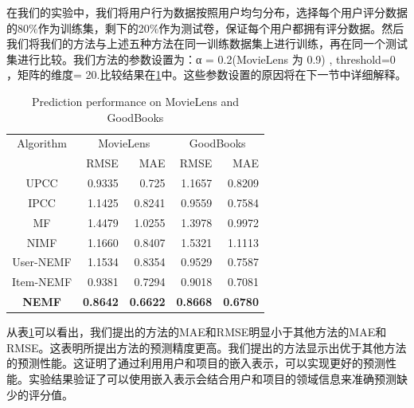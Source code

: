 \documentclass[lang=cn,11pt]{elegantpaper}
\begin{document}
在我们的实验中，我们将用户行为数据按照用户均匀分布，选择每个用户评分数据的80\%作为训练集，剩下的20\%作为测试卷，保证每个用户都拥有评分数据。然后我们将我们的方法与上述五种方法在同一训练数据集上进行训练，再在同一个测试集进行比较。我们方法的参数设置为：α = 0.2(MovieLens 为 0.9) , threshold=0 ，矩阵的维度= 20.比较结果在\ref{tab:result}中。这些参数设置的原因将在下一节中详细解释。

\begin{table}[tbp]
	\centering
	\caption{Prediction performance on MovieLens and GoodBooks \label{tab:result}}
	\setlength{\tabcolsep}{7mm}
	
	\begin{tabular}{ccrrrr}
		\toprule
		\multicolumn{ 2}{c}{Algorithm} & \multicolumn{ 2}{c}{MovieLens} & \multicolumn{ 2}{c}{GoodBooks} \\
		
		\multicolumn{ 2}{c}{} &       RMSE &        MAE &       RMSE &        MAE \\
		\midrule
		
		\multicolumn{ 2}{c}{UPCC} &     0.9335 &      0.725 &     1.1657 &     0.8209 \\
		
		\multicolumn{ 2}{c}{IPCC} &     1.1425 &     0.8241 &     0.9559 &     0.7584 \\
		
		\multicolumn{ 2}{c}{MF} &     1.4479 &     1.0255 &     1.3978 &     0.9972 \\
		
		\multicolumn{ 2}{c}{NIMF} &    1.1660 &    0.8407&    1.5321 &     1.1113 \\
		
		\multicolumn{ 2}{c}{User-NEMF} &     1.1534 &     0.8354 &     0.9529 &     0.7587 \\
		
		\multicolumn{ 2}{c}{Item-NEMF} &     0.9381 &     0.7294 &     0.9018 &     0.7081 \\
		
		\multicolumn{ 2}{c}{\textbf{NEMF}} &     \textbf{0.8642} &     \textbf{0.6622} &     \textbf{0.8668} &     \textbf{0.6780} \\
		\bottomrule
	\end{tabular} 	
\end{table}

从表\ref{tab:result}可以看出，我们提出的方法的MAE和RMSE明显小于其他方法的MAE和RMSE。这表明所提出方法的预测精度更高。我们提出的方法显示出优于其他方法的预测性能。这证明了通过利用用户和项目的嵌入表示，可以实现更好的预测性能。实验结果验证了可以使用嵌入表示会结合用户和项目的领域信息来准确预测缺少的评分值。
\end{document}
